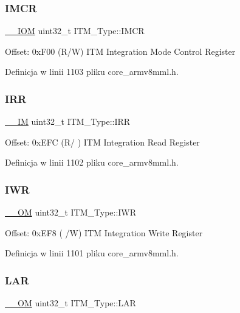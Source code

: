 \subsubsection{\texorpdfstring{I\+M\+CR}{IMCR}}
{\footnotesize\ttfamily \hyperlink{core__sc300_8h_ab6caba5853a60a17e8e04499b52bf691}{\+\_\+\+\_\+\+I\+OM} uint32\+\_\+t I\+T\+M\+\_\+\+Type\+::\+I\+M\+CR}

Offset\+: 0x\+F00 (R/W) I\+TM Integration Mode Control Register 

Definicja w linii 1103 pliku core\+\_\+armv8mml.\+h.

\mbox{\label{struct_i_t_m___type_a66eb82a070953f09909f39b8e516fb91}} 
\subsubsection{\texorpdfstring{I\+RR}{IRR}}
{\footnotesize\ttfamily \hyperlink{core__sc300_8h_a4cc1649793116d7c2d8afce7a4ffce43}{\+\_\+\+\_\+\+IM} uint32\+\_\+t I\+T\+M\+\_\+\+Type\+::\+I\+RR}

Offset\+: 0x\+E\+FC (R/ ) I\+TM Integration Read Register 

Definicja w linii 1102 pliku core\+\_\+armv8mml.\+h.

\mbox{\label{struct_i_t_m___type_aa9da04891e48d1a2f054de186e9c4c94}} 
\subsubsection{\texorpdfstring{I\+WR}{IWR}}
{\footnotesize\ttfamily \hyperlink{core__sc300_8h_a0ea2009ed8fd9ef35b48708280fdb758}{\+\_\+\+\_\+\+OM} uint32\+\_\+t I\+T\+M\+\_\+\+Type\+::\+I\+WR}

Offset\+: 0x\+E\+F8 ( /W) I\+TM Integration Write Register 

Definicja w linii 1101 pliku core\+\_\+armv8mml.\+h.

\mbox{\label{struct_i_t_m___type_a7f9c2a2113a11c7f3e98915f95b669d5}} 
\subsubsection{\texorpdfstring{L\+AR}{LAR}}
{\footnotesize\ttfamily \hyperlink{core__sc300_8h_a0ea2009ed8fd9ef35b48708280fdb758}{\+\_\+\+\_\+\+OM} uint32\+\_\+t I\+T\+M\+\_\+\+Type\+::\+L\+AR}

